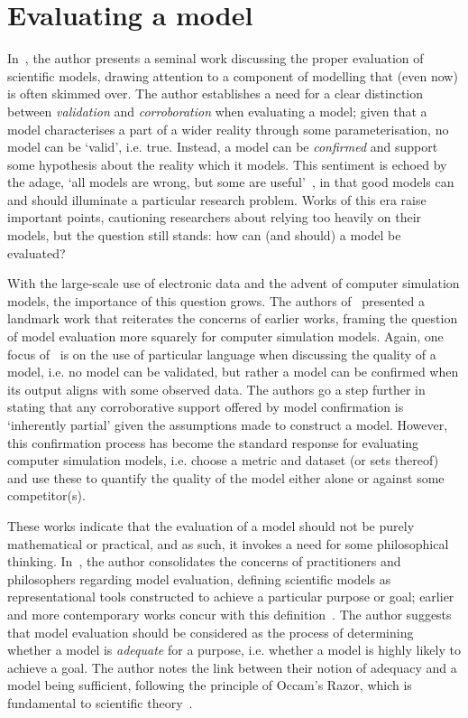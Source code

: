 \section{Evaluating a model}\label{sec:evaluation}

In~\cite{Caswell1976}, the author presents a seminal work discussing the proper
evaluation of scientific models, drawing attention to a component of modelling
that (even now) is often skimmed over. The author establishes a need for a clear
distinction between \emph{validation} and \emph{corroboration} when evaluating a
model; given that a model characterises a part of a wider reality through some
parameterisation, no model can be `valid', i.e. true. Instead, a model can be
\emph{confirmed} and support some hypothesis about the reality which it models.
This sentiment is echoed by the adage, `all models are wrong, but some are
useful'~\cite{Box1979}, in that good models can and should illuminate a
particular research problem. Works of this era raise important points,
cautioning researchers about relying too heavily on their models, but the
question still stands: how can (and should) a model be evaluated?

With the large-scale use of electronic data and the advent of computer
simulation models, the importance of this question grows. The authors
of~\cite{Oreskes1994} presented a landmark work that reiterates the concerns of
earlier works, framing the question of model evaluation more squarely for
computer simulation models. Again, one focus of~\cite{Oreskes1994} is on the use
of particular language when discussing the quality of a model, i.e. no model can
be validated, but rather a model can be confirmed when its output aligns with
some observed data. The authors go a step further in stating that any
corroborative support offered by model confirmation is `inherently partial'
given the assumptions made to construct a model. However, this confirmation
process has become the standard response for evaluating computer simulation
models, i.e. choose a metric and dataset (or sets thereof) and use these to
quantify the quality of the model either alone or against some competitor(s).

These works indicate that the evaluation of a model should not be purely
mathematical or practical, and as such, it invokes a need for some philosophical
thinking. In~\cite{Parker2010}, the author consolidates the concerns of
practitioners and philosophers regarding model evaluation, defining scientific
models as representational tools constructed to achieve a particular purpose or
goal; earlier and more contemporary works concur with this
definition~\cite{Baumberger2017,Caswell1976,Currie2017}. The author suggests
that model evaluation should be considered as the process of determining whether
a model is \emph{adequate} for a purpose, i.e. whether a model is highly likely
to achieve a goal. The author notes the link between their notion of adequacy
and a model being sufficient, following the principle of Occam's Razor, which is
fundamental to scientific theory~\cite{Walsh1979}.

